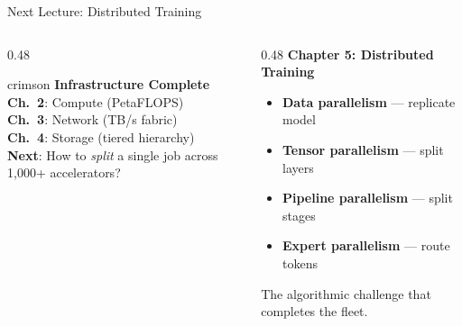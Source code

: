 \documentclass[aspectratio=169, 12pt]{beamer}
\begin{document}
\begin{frame}{Next Lecture: Distributed Training}

\footnotesize
\begin{columns}[T]
  \begin{column}{0.48\textwidth}
    \vspace{0.3cm}
    \begin{mlsyscard}{crimson}
    {\normalsize\bfseries Infrastructure Complete}\\[0.2cm]
    {\footnotesize
    \textcolor{computestroke}{\textbf{Ch.~2}}: Compute (PetaFLOPS)\\
    \textcolor{routingstroke}{\textbf{Ch.~3}}: Network (TB/s fabric)\\
    \textcolor{datastroke}{\textbf{Ch.~4}}: Storage (tiered hierarchy)\\[0.15cm]
    \textbf{Next}: How to \emph{split} a single job across 1,000+ accelerators?}
    \end{mlsyscard}
  \end{column}
  \begin{column}{0.48\textwidth}
    \vspace{0.3cm}
    {\normalsize\textbf{Chapter 5: Distributed Training}}

    \vspace{0.15cm}
    \begin{itemize}\setlength\itemsep{2pt}
      \item \textcolor{datastroke}{\textbf{Data parallelism}} --- replicate model
      \item \textcolor{computestroke}{\textbf{Tensor parallelism}} --- split layers
      \item \textcolor{routingstroke}{\textbf{Pipeline parallelism}} --- split stages
      \item \textcolor{errorstroke}{\textbf{Expert parallelism}} --- route tokens
    \end{itemize}

    \vspace{0.1cm}
    {\footnotesize The algorithmic challenge that completes the fleet.}
  \end{column}
\end{columns}

\end{frame}
\end{document}
